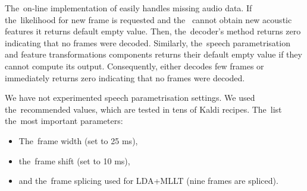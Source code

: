 The~on-line implementation  of  easily handles missing audio data.
If the~likelihood for new frame is requested and the~ cannot obtain new acoustic features it returns default empty value.
Then, the~decoder's method  returns zero indicating that no frames were decoded.
Similarly, the~speech parametrisation and feature transformations components returns their default empty value if they cannot compute its output.
Consequently,  either decodes few frames or immediately returns zero indicating that no frames were decoded.

We have not experimented speech parametrisation settings. 
We used the~recommended values, which are tested in tens of Kaldi recipes.
The~list the~most important parameters:
\begin{itemize}
    \item The~frame width (set to 25 ms), 
    \item the~frame shift (set to 10 ms), 
    \item and the~frame splicing used for \ac{LDA}+\ac{MLLT} (nine frames are spliced).
\end{itemize}



